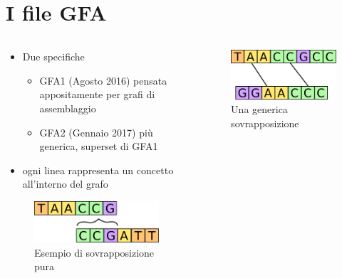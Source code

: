 \documentclass{beamer}
\begin{document}
 
 \section{I file GFA}
 \begin{frame}[fragile]{\secname}
 	\begin{columns}[b, onlytextwidth]
 		\begin{column}{0.7\textwidth}
 			\begin{itemize}
				\item Due specifiche
					\begin{itemize}
							\item GFA1 {\scriptsize (Agosto 2016)} pensata appositamente per grafi di assemblaggio
							\item GFA2 {\scriptsize (Gennaio 2017)} più generica, superset di GFA1
					\end{itemize}					
				\item ogni linea rappresenta un concetto
					all'interno del grafo
 			\end{itemize}
 			\begin{figure}
 				\centering
 				\captionsetup{justification=centering}
 				\includegraphics[scale=0.30]{dov_ov_++}
 				\caption{Esempio di sovrapposizione pura}
 			\end{figure}
 		\end{column}
 		\begin{column}{0.3\textwidth}
 			\begin{figure}
 				\centering
 				\captionsetup{justification=centering}
 				\includegraphics[scale=0.27]{generic-overlap}
 				\caption{Una generica sovrapposizione}
 			\end{figure}
 		\end{column}
 	\end{columns}
 \end{frame}
 
\end{document}
